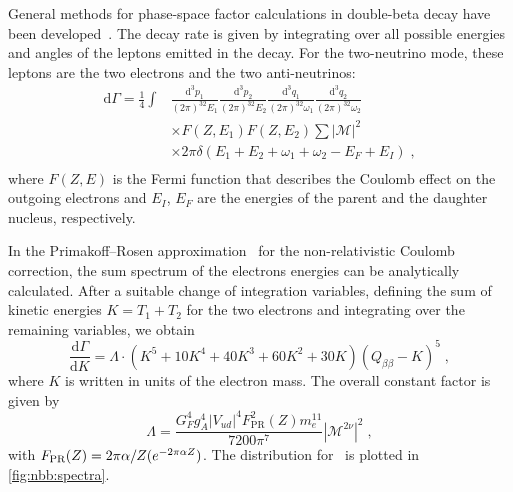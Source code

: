 General methods for phase-space factor calculations in double-beta decay have
been developed~\cite{Doi1981,Doi1983,Tomoda1991}. The decay rate is given by
integrating over all possible energies and angles of the leptons emitted in the
decay. For the two-neutrino mode, these leptons are the two electrons and the
two anti-neutrinos:
\begin{equation}
  \begin{split}
    \text{d}\Gamma = \frac{1}{4} \int & \frac{\text{d}^3p_1}{(2\pi)^32E_1}
                                        \frac{\text{d}^3p_2}{(2\pi)^32E_2}
                                        \frac{\text{d}^3q_1}{(2\pi)^32\omega_1}
                                        \frac{\text{d}^3q_2}{(2\pi)^32\omega_2} \\
                                      & \times F(Z,E_1) F(Z,E_2) \sum |\mathcal{M}|^2 \\
                                      & \times 2\pi\delta (E_1 + E_2 + \omega_1 +
                                        \omega_2 - E_F + E_I) \;, \\
  \end{split}
\end{equation}
where $F(Z,E)$ is the Fermi function that describes the Coulomb effect on the
outgoing electrons and $E_I$, $E_F$ are the energies of the parent and the
daughter nucleus, respectively.

In the Primakoff–Rosen approximation~\cite{Primakoff1959} for the
non-relativistic Coulomb correction, the sum spectrum of the electrons energies
can be analytically calculated. After a suitable change of integration
variables, defining the sum of kinetic energies $K=T_1+T_2$ for the two
electrons and integrating over the remaining variables, we obtain
\begin{equation}\label{eq:nbb:stdmodel}
  \frac{\text{d}\Gamma}{\text{d}K} = \Lambda \cdot (K^5+10K^4+40K^3+60K^2+30K)
                                     (Q_{\beta\beta}-K)^5 \;,
\end{equation}
where $K$ is written in units of the electron mass. The overall constant factor
is given by
\begin{equation}
  \Lambda = \frac{G_F^4g_A^4|V_{ud}|^4F^2_\text{PR}(Z)m_e^{11}}{7200\pi^7}
            |\mathcal{M}^{2\nu}|^2 \;,
\end{equation}
with $F_\text{PR}(Z) = 2\pi\alpha/Z(\-e^{-2\pi\alpha Z})$. The distribution for
\gesix\ is plotted in \ref{fig:nbb:spectra}.

